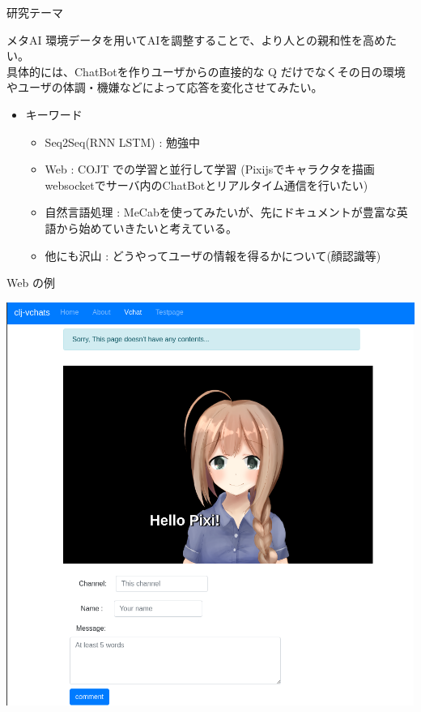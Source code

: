 \documentclass[dvipdfmx,10pt,presentation]{beamer}
\begin{document}
\begin{frame}[allowframebreaks]{研究テーマ}
\begin{block}{メタAI}
環境データを用いてAIを調整することで、より人との親和性を高めたい。\\
具体的には、ChatBotを作りユーザからの直接的な Q だけでなくその日の環境やユーザの体調・機嫌などによって応答を変化させてみたい。\\
\begin{itemize}
\item キーワード\\
\begin{itemize}
\item Seq2Seq(RNN LSTM) : 勉強中\\
\item Web : COJT での学習と並行して学習 (Pixijsでキャラクタを描画 websocketでサーバ内のChatBotとリアルタイム通信を行いたい)\\
\item 自然言語処理 : MeCabを使ってみたいが、先にドキュメントが豊富な英語から始めていきたいと考えている。\\
\item 他にも沢山 : どうやってユーザの情報を得るかについて(顔認識等)\\
\end{itemize}
\end{itemize}
\end{block}
\begin{block}{Web の例}
\begin{center}
\includegraphics[width=0.7\linewidth]{./screen.png}
\end{center}
\end{block}



\end{frame}
\end{document}
